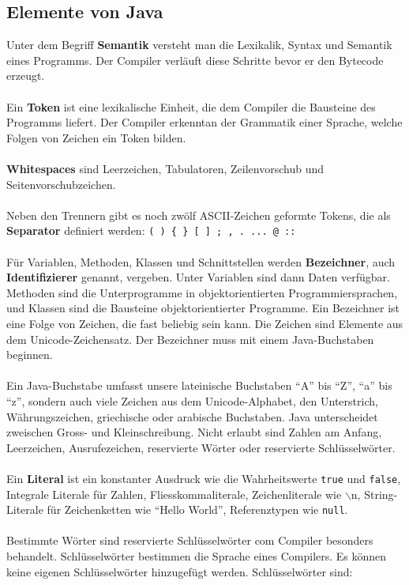 \subsection{Elemente von Java}
Unter dem Begriff \textbf{Semantik} versteht man die Lexikalik, Syntax und Semantik eines Programms. Der Compiler verläuft diese Schritte bevor er den Bytecode erzeugt.
\\\\
Ein \textbf{Token} ist eine lexikalische Einheit, die dem Compiler die Bausteine des Programms liefert. Der Compiler erkenntan der Grammatik einer Sprache, welche Folgen von Zeichen ein Token bilden.
\\\\
\textbf{Whitespaces} sind Leerzeichen, Tabulatoren, Zeilenvorschub und Seitenvorschubzeichen.
\\\\
Neben den Trennern gibt es noch zwölf ASCII-Zeichen geformte Tokens, die als \textbf{Separator} definiert werden: \texttt{( ) \{ \} [ ] ; , . ... @ ::}
\\\\
Für Variablen, Methoden, Klassen und Schnittstellen werden \textbf{Bezeichner}, auch \textbf{Identifizierer} genannt, vergeben. Unter Variablen sind dann Daten verfügbar. Methoden sind die Unterprogramme in objektorientierten Programmiersprachen, und Klassen sind die Bausteine objektorientierter Programme. Ein Bezeichner ist eine Folge von Zeichen, die fast beliebig sein kann. Die Zeichen sind Elemente aus dem Unicode-Zeichensatz. Der Bezeichner muss mit einem Java-Buchstaben beginnen. 
\\\\
Ein Java-Buchstabe umfasst unsere lateinische Buchstaben ``A'' bis ``Z'', ``a'' bis ``z'', sondern auch viele Zeichen aus dem Unicode-Alphabet, den Unterstrich, Währungszeichen, griechische oder arabische Buchstaben. Java unterscheidet zweischen Gross- und Kleinschreibung. Nicht erlaubt sind Zahlen am Anfang, Leerzeichen, Ausrufezeichen, reservierte Wörter oder reservierte Schlüsselwörter.
\\\\
Ein \textbf{Literal} ist ein konstanter Ausdruck wie die Wahrheitswerte \texttt{true} und \texttt{false}, Integrale Literale für Zahlen, Fliesskommaliterale, Zeichenliterale wie $\backslash$n, String-Literale für Zeichenketten wie ``Hello World'', Referenztypen wie \texttt{null}.
\\\\
Bestimmte Wörter sind reservierte Schlüsselwörter com Compiler besonders behandelt. Schlüsselwörter bestimmen die Sprache eines Compilers. Es können keine eigenen Schlüsselwörter hinzugefügt werden. Schlüsselwörter sind:
